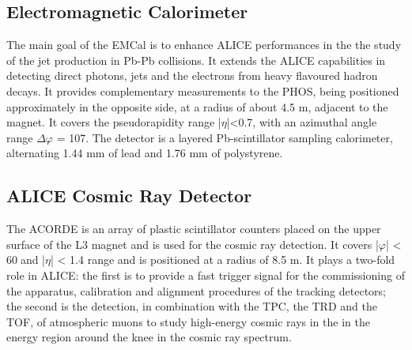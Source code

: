 \subsection*{Electromagnetic Calorimeter}
The main goal of the EMCal is to enhance ALICE performances in the the study of the jet production in Pb-Pb collisions. It extends the ALICE capabilities in detecting direct photons, jets and the electrons from heavy flavoured hadron decays. It provides complementary measurements to the PHOS, being positioned approximately in the opposite side, at a radius of about 4.5 m, adjacent to the magnet. It covers the pseudorapidity range |$\eta$|<0.7, with an azimuthal angle range $\Delta\varphi$ = 107\textdegree. The detector is a layered Pb-scintillator sampling calorimeter, alternating 1.44 mm of lead and 1.76 mm of polystyrene.
\subsection*{ALICE Cosmic Ray Detector}
The ACORDE is an array of plastic scintillator counters placed on the upper surface of the L3 magnet and is used for the cosmic ray detection. It covers |$\varphi$| < 60\textdegree $\;$and |$\eta$| < 1.4 range and is positioned at a radius of 8.5 m. It plays a two-fold role in ALICE: the first is to provide a fast trigger signal for the commissioning of the apparatus, calibration and alignment procedures of the tracking detectors; the second is the detection, in combination with the TPC, the TRD and the TOF, of atmospheric muons to study high-energy cosmic rays in the in the energy region around the knee in the cosmic ray spectrum.
